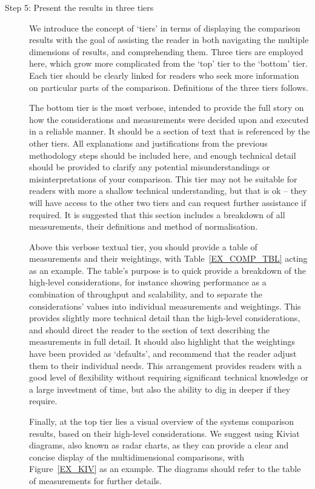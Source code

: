 \begin{description}
    \item[Step 5: Present the results in three tiers]
      We introduce the concept of `tiers' in terms of displaying the comparison results with the goal of assisting the reader in both navigating the multiple dimensions of results, and comprehending them. Three tiers are employed here, which grow more complicated from the `top' tier to the `bottom' tier. Each tier should be clearly linked for readers who seek more information on particular parts of the comparison. Definitions of the three tiers follows.
    
      The bottom tier is the most verbose, intended to provide the full story on how the considerations and measurements were decided upon and executed in a reliable manner. It should be a section of text that is referenced by the other tiers. All explanations and justifications from the previous methodology steps should be included here, and enough technical detail should be provided to clarify any potential misunderstandings or misinterpretations of your comparison. This tier may not be suitable for readers with more a shallow technical understanding, but that is ok -- they will have access to the other two tiers and can request further assistance if required. It is suggested that this section includes a breakdown of all measurements, their definitions and method of normalisation.

      Above this verbose textual tier, you should provide a table of measurements and their weightings, with Table~\ref{EX_COMP_TBL} acting as an example. The table's purpose is to quick provide a breakdown of the high-level considerations, for instance showing performance as a combination of throughput and scalability, and to separate the considerations' values into individual measurements and weightings. This provides slightly more technical detail than the high-level considerations, and should direct the reader to the section of text describing the measurements in full detail. It should also highlight that the weightings have been provided as `defaults', and recommend that the reader adjust them to their individual needs. This arrangement provides readers with a good level of flexibility without requiring significant technical knowledge or a large investment of time, but also the ability to dig in deeper if they require.
      
      Finally, at the top tier lies a visual overview of the systems comparison results, based on their high-level considerations. We suggest using Kiviat diagrams, also known as radar charts, as they can provide a clear and concise display of the multidimensional comparisons, with Figure~\ref{EX_KIV} as an example. The diagrams should refer to the table of measurements for further details.
      

\end{description}

